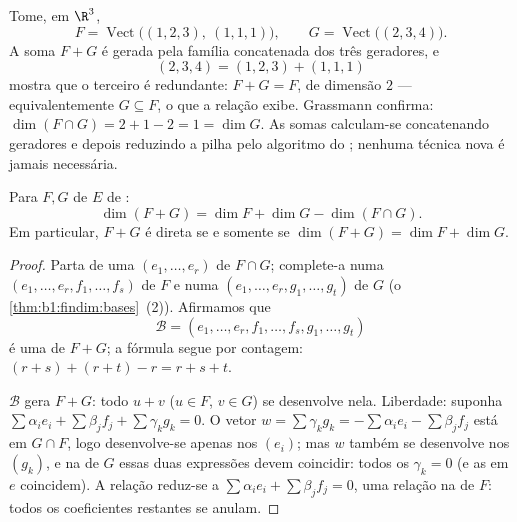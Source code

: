 \begin{example}
\label{ex:b1:findim:sumconcat}
Tome, em $\R^3$,
\[
F = \operatorname{Vect}\bigl((1,2,3),\ (1,1,1)\bigr),
\qquad
G = \operatorname{Vect}\bigl((2,3,4)\bigr) .
\]
A soma $F + G$ é gerada pela família concatenada dos três
geradores, e
\[
(2, 3, 4) = (1, 2, 3) + (1, 1, 1)
\]
mostra que o terceiro é redundante: $F + G = F$, de dimensão $2$ ---
equivalentemente $G \subseteq F$, o que a relação exibe. Grassmann confirma:
$\dim(F \cap G) = 2 + 1 - 2 = 1 = \dim G$. As somas calculam-se concatenando geradores e depois
reduzindo a pilha pelo algoritmo do ; nenhuma técnica nova é
jamais necessária.
\end{example}

\begin{theorem}\label{thm:b1:findim:grassmann}
Para  $F, G$ de $E$ de :
\[
\dim(F + G) = \dim F + \dim G - \dim(F \cap G) .
\]
Em particular, $F + G$ é direta se e somente se $\dim(F + G) = \dim F + \dim G$.
\end{theorem}

\begin{proof}
Parta de uma  $(e_1, \dots, e_r)$ de $F \cap G$; complete-a numa  $(e_1, \dots, e_r, f_1, \dots, f_s)$ de $F$
e numa  $(e_1, \dots, e_r, g_1, \dots, g_t)$ de $G$ (o \cref{thm:b1:findim:bases}~(2)). Afirmamos que
\[
\mathcal{B} = (e_1, \dots, e_r, f_1, \dots, f_s, g_1, \dots, g_t)
\]
é uma  de $F + G$; a fórmula segue por contagem: $(r + s) +
(r + t) - r = r + s + t$.

$\mathcal{B}$ gera $F + G$: todo $u + v$ ($u \in F$, $v \in G$) se
desenvolve nela. Liberdade: suponha $\sum \alpha_i e_i + \sum
\beta_j f_j + \sum \gamma_k g_k = 0$. O vetor $w = \sum \gamma_k
g_k = -\sum\alpha_i e_i - \sum\beta_j f_j$ está em
$G \cap F$, logo desenvolve-se apenas nos $(e_i)$; mas $w$ também se
desenvolve nos $(g_k)$, e na  de $G$ essas duas expressões
devem coincidir: todos os $\gamma_k = 0$ (e as  em $e$
coincidem). A relação reduz-se a $\sum\alpha_i e_i + \sum\beta_j f_j = 0$, uma relação na  de $F$:
todos os coeficientes restantes se anulam.
\end{proof}

